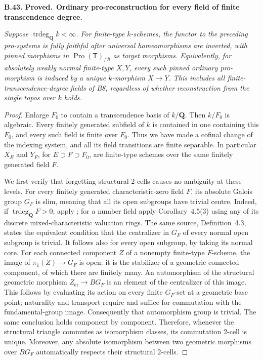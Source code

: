 \documentclass[11pt,a4paper]{article}
\newcommand{\Q}{\mathbf Q}
\newenvironment{claim}[3]{\par\medskip\noindent\hypertarget{#1}{\textbf{#1. #2.}}\ \textbf{#3.}\par\nopagebreak\smallskip\begingroup\itshape}{\endgroup\par\smallskip}
\begin{document}
\begin{claim}{B.43}{Proved}{Ordinary pro-reconstruction for every field of finite transcendence degree}
Suppose \(\operatorname{trdeg}_{\Q}k<\infty\). For finite-type
\(k\)-schemes, the functor to the preceding pro-systems is fully faithful
after universal homeomorphisms are inverted, with pinned morphisms in
\(\operatorname{Pro}(\mathsf T)_{/\mathcal B}\) as target morphisms.
Equivalently, for absolutely weakly normal finite-type \(X,Y\), every
such pinned ordinary pro-morphism is induced by a unique \(k\)-morphism
\(X\to Y\). This includes all finite-transcendence-degree fields of B8,
regardless of whether reconstruction from the single topos over \(k\)
holds.
\end{claim}
\begin{proof}
Enlarge \(F_0\) to contain a transcendence basis of \(k/\Q\).
Then \(k/F_0\) is algebraic. Every finitely generated subfield of \(k\)
is contained in one containing this \(F_0\), and every such field is
finite over \(F_0\). Thus we have made a cofinal change of the indexing
system, and all its field transitions are finite separable. In
particular \(X_E\) and \(Y_F\), for \(E\supset F\supset F_0\),
are finite-type schemes over the same finitely generated field \(F\).

We first verify that forgetting structural 2-cells causes no ambiguity
at these levels. For every finitely generated characteristic-zero
field \(F\), its absolute Galois group \(G_F\) is slim, meaning that
all its open subgroups have trivial centre. Indeed, if
\(\operatorname{trdeg}_{\Q}F>0\), apply
\citep[Corollary~4.5(1)]{HoshiTsujimura2023}; for a number field apply
Corollary~4.5(3) using any of its discrete mixed-characteristic valuation
rings. The same source, Definition~4.3, states the equivalent condition
that the centralizer in \(G_F\) of every normal open subgroup is trivial.
It follows also for every open subgroup, by taking its normal core.
For each connected component \(Z\) of a nonempty finite-type
\(F\)-scheme, the image of \(\pi_1(Z)\to G_F\) is open: it is the
stabilizer of a geometric connected component, of which there are
finitely many. An automorphism of the structural geometric morphism
\(Z_{\mathrm{et}}\to BG_F\) is an element of the centralizer of this
image. This follows by evaluating its action on every finite
\(G_F\)-set at a geometric base point; naturality and transport require
and suffice for commutation with the fundamental-group image.
Consequently that automorphism group is trivial. The same conclusion
holds component by component. Therefore, whenever the structural
triangle commutes as isomorphism classes, its commutation 2-cell is
unique. Moreover, any absolute isomorphism between two geometric
morphisms over \(BG_F\) automatically respects their structural 2-cells.


\end{proof}
\end{document}
